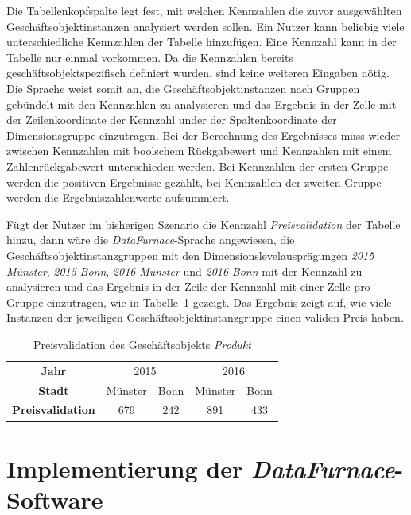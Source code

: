 \documentclass[
  language=german, %
  type=bachelor,%
  ngerman
]{isthesis}
\begin{document}
\begin{content}
  Die Tabellenkopfspalte legt fest, mit welchen Kennzahlen die zuvor
  ausgewählten Geschäftsobjektinstanzen analysiert werden sollen. Ein Nutzer
  kann beliebig viele unterschiedliche Kennzahlen der Tabelle hinzufügen. Eine
  Kennzahl kann in der Tabelle nur einmal vorkommen. Da die Kennzahlen bereits
  geschäftsobjektspezifisch definiert wurden, sind keine weiteren Eingaben
  nötig. Die Sprache weist somit an, die Geschäftsobjektinstanzen nach Gruppen
  gebündelt mit den Kennzahlen zu analysieren und das Ergebnis in der Zelle mit
  der Zeilenkoordinate der Kennzahl under der Spaltenkoordinate der
  Dimensionsgruppe einzutragen. Bei der Berechnung des Ergebnisses muss wieder
  zwischen Kennzahlen mit boolschem Rückgabewert und Kennzahlen mit einem
  Zahlenrückgabewert unterschieden werden. Bei Kennzahlen der ersten
  Gruppe werden die positiven Ergebnisse gezählt, bei Kennzahlen der zweiten
  Gruppe werden die Ergebniszahlenwerte aufsummiert.
  
	Fügt der Nutzer im bisherigen Szenario die Kennzahl \textit{Preisvalidation}
	der Tabelle hinzu, dann wäre die \textit{DataFurnace}-Sprache angewiesen, die
	Geschäftsobjektinstanzgruppen mit den Dimensionslevelausprägungen
	\textit{2015} \textit{Münster}, \textit{2015} \textit{Bonn}, \textit{2016}
	\textit{Münster} und \textit{2016} \textit{Bonn} mit der Kennzahl zu analysieren
	und das Ergebnis in der Zeile der Kennzahl mit einer Zelle pro Gruppe
	einzutragen, wie in Tabelle~\ref{table:preisvalidation} gezeigt. Das Ergebnis
	zeigt auf, wie viele Instanzen der jeweiligen Geschäftsobjektinstanzgruppe
	einen validen Preis haben.

  \begin{table}
    \footnotesize
    \begin{tabular}{c c c c c}
      \textbf{Jahr} & \multicolumn{2}{c}{2015} & \multicolumn{2}{c}{2016} \\
      \cmidrule(lr){2-3}\cmidrule(lr){4-5}
      \textbf{Stadt} & Münster & Bonn & Münster & Bonn \\
      \toprule
      \textbf{Preisvalidation} & 679 & 242 & 891 & 433 \\
    \end{tabular}
    \caption{Preisvalidation des Geschäftsobjekts \textit{Produkt}}\label{table:preisvalidation}
  \end{table}


  \chapter{Implementierung der \textit{DataFurnace}-Software}\label{ch:implementierung-datafurnace}


\end{content}
\end{document}
